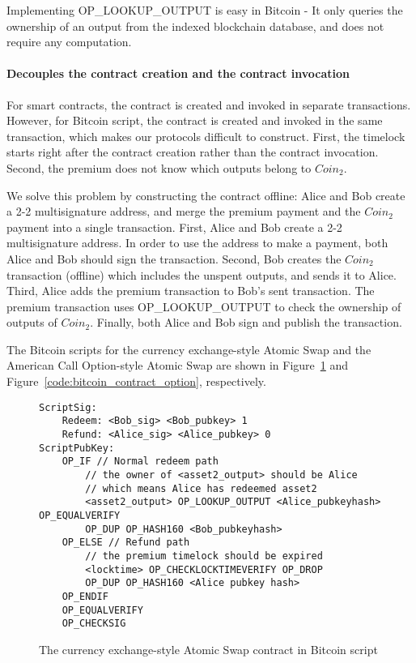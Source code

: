 Implementing OP\_LOOKUP\_OUTPUT is easy in Bitcoin - It only queries the ownership of an output from the indexed blockchain database, and does not require any computation.

\paragraph{Decouples the contract creation and the contract invocation}
For smart contracts, the contract is created and invoked in separate transactions.
However, for Bitcoin script, the contract is created and invoked in the same transaction, which makes our protocols difficult to construct.
First, the timelock starts right after the contract creation rather than the contract invocation.
Second, the premium does not know which outputs belong to $Coin_2$.

We solve this problem by constructing the contract offline:
Alice and Bob create a 2-2 multisignature address, and merge the premium payment and the $Coin_2$ payment into a single transaction.
First, Alice and Bob create a 2-2 multisignature address.
In order to use the address to make a payment, both Alice and Bob should sign the transaction.
Second, Bob creates the $Coin_2$ transaction (offline) which includes the unspent outputs, and sends it to Alice.
Third, Alice adds the premium transaction to Bob's sent transaction.
The premium transaction uses OP\_LOOKUP\_OUTPUT to check the ownership of outputs of $Coin_2$.
Finally, both Alice and Bob sign and publish the transaction.

The Bitcoin scripts for the currency exchange-style Atomic Swap and the American Call Option-style Atomic Swap are shown in Figure~\ref{code:bitcoin_contract_currency_exchange} and Figure~\ref{code:bitcoin_contract_option}, respectively.

\begin{figure}
\begin{lstlisting}[language=Solidity, basicstyle=\tiny]
ScriptSig:
    Redeem: <Bob_sig> <Bob_pubkey> 1
    Refund: <Alice_sig> <Alice_pubkey> 0
ScriptPubKey:
    OP_IF // Normal redeem path
        // the owner of <asset2_output> should be Alice
        // which means Alice has redeemed asset2
        <asset2_output> OP_LOOKUP_OUTPUT <Alice_pubkeyhash> OP_EQUALVERIFY 
        OP_DUP OP_HASH160 <Bob_pubkeyhash>
    OP_ELSE // Refund path
        // the premium timelock should be expired
        <locktime> OP_CHECKLOCKTIMEVERIFY OP_DROP
        OP_DUP OP_HASH160 <Alice pubkey hash>
    OP_ENDIF
    OP_EQUALVERIFY
    OP_CHECKSIG
\end{lstlisting}
\label{code:bitcoin_contract_currency_exchange}
\caption{The currency exchange-style Atomic Swap contract in Bitcoin script}
\end{figure}

